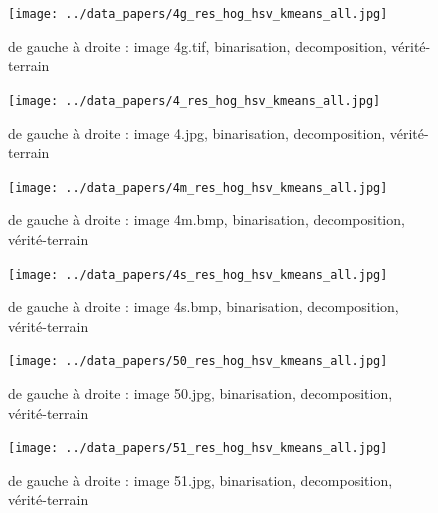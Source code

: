 \documentclass{book}
\begin{document}
\begin{figure}[H]
\begin{center}
\texttt{[image: ../data\_papers/4g\_res\_hog\_hsv\_kmeans\_all.jpg]}
\end{center}
\caption{de gauche à droite : image 4g.tif, binarisation, decomposition, vérité-terrain}
\label{4g}
\end{figure}
\clearpage


\begin{figure}[H]
\begin{center}
\texttt{[image: ../data\_papers/4\_res\_hog\_hsv\_kmeans\_all.jpg]}
\end{center}
\caption{de gauche à droite : image 4.jpg, binarisation, decomposition, vérité-terrain}
\label{4}
\end{figure}
\clearpage


\begin{figure}[H]
\begin{center}
\texttt{[image: ../data\_papers/4m\_res\_hog\_hsv\_kmeans\_all.jpg]}
\end{center}
\caption{de gauche à droite : image 4m.bmp, binarisation, decomposition, vérité-terrain}
\label{4m}
\end{figure}
\clearpage


\begin{figure}[H]
\begin{center}
\texttt{[image: ../data\_papers/4s\_res\_hog\_hsv\_kmeans\_all.jpg]}
\end{center}
\caption{de gauche à droite : image 4s.bmp, binarisation, decomposition, vérité-terrain}
\label{4s}
\end{figure}
\clearpage


\begin{figure}[H]
\begin{center}
\texttt{[image: ../data\_papers/50\_res\_hog\_hsv\_kmeans\_all.jpg]}
\end{center}
\caption{de gauche à droite : image 50.jpg, binarisation, decomposition, vérité-terrain}
\label{50}
\end{figure}
\clearpage


\begin{figure}[H]
\begin{center}
\texttt{[image: ../data\_papers/51\_res\_hog\_hsv\_kmeans\_all.jpg]}
\end{center}
\caption{de gauche à droite : image 51.jpg, binarisation, decomposition, vérité-terrain}
\label{51}
\end{figure}
\clearpage
\end{document}

